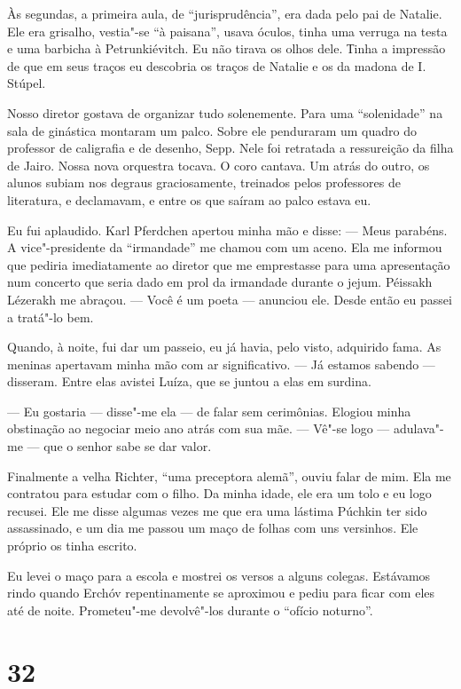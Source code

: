 Às segundas, a primeira aula, de ``jurisprudência'', era dada pelo pai
de Natalie. Ele era grisalho, vestia"-se ``à paisana'', usava óculos,
tinha uma verruga na testa e uma barbicha à Petrunkiévitch. Eu não
tirava os olhos dele. Тinha a impressão de que em seus traços eu
descobria os traços de Natalie e os da madona de I. Stúpel.

Nosso diretor gostava de organizar tudo solenemente. Para uma
``solenidade'' na sala de ginástica montaram um palco. Sobre ele
penduraram um quadro do professor de caligrafia e de desenho, Sepp. Nele
foi retratada a ressureição da filha de Jairo. Nossa nova orquestra
tocava. O coro cantava. Um atrás do outro, os alunos subiam nos degraus
graciosamente, treinados pelos professores de literatura, e declamavam,
e entre os que saíram ao palco estava eu.

Eu fui aplaudido. Karl Pferdchen apertou minha mão e disse: --- Meus
parabéns. A vice"-presidente da ``irmandade'' me chamou com um aceno. Ela
me informou que pediria imediatamente ao diretor que me emprestasse para
uma apresentação num concerto que seria dado em prol da irmandade
durante o jejum. Péissakh Lézerakh me abraçou. --- Você é um poeta ---
anunciou ele. Desde então eu passei a tratá"-lo bem.

Quando, à noite, fui dar um passeio, eu já havia, pelo visto, adquirido
fama. As meninas apertavam minha mão com ar significativo. --- Já
estamos sabendo --- disseram. Entre elas avistei Luíza, que se juntou a
elas em surdina.

--- Eu gostaria --- disse"-me ela --- de falar sem cerimônias. Elogiou
minha obstinação ao negociar meio ano atrás com sua mãe. --- Vê"-se logo
--- adulava"-me --- que o senhor sabe se dar valor.

Finalmente a velha Richter, ``uma preceptora alemã'', ouviu falar de
mim. Ela me contratou para estudar com o filho. Da minha idade, ele era
um tolo e eu logo recusei. Ele me disse algumas vezes me que era uma
lástima Púchkin ter sido assassinado, e um dia me passou um maço de
folhas com uns versinhos. Ele próprio os tinha escrito.

Eu levei o maço para a escola e mostrei os versos a alguns colegas.
Estávamos rindo quando Erchóv repentinamente se aproximou e pediu para
ficar com eles até de noite. Prometeu"-me devolvê"-los durante o ``ofício
noturno''.

\section{32}


